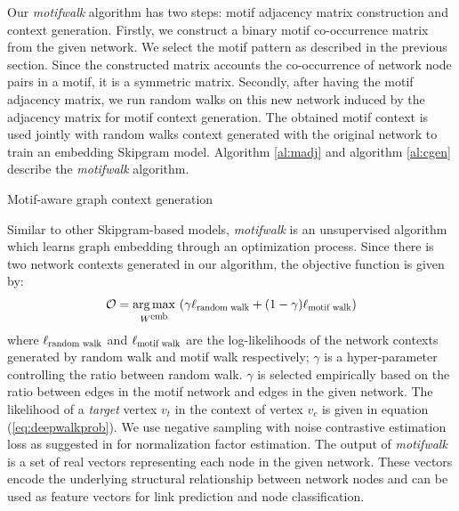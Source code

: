 \documentclass{article}
\DeclareMathOperator*{\argmax}{arg\,max}
\theoremstyle{definition}
\begin{document}
Our \emph{motifwalk} algorithm has two steps: motif adjacency matrix
construction and context generation. Firstly, we construct a binary
motif co-occurrence matrix from the given network. We select the motif
pattern as described in the previous section. Since the constructed matrix 
accounts the co-occurrence of network node pairs in a motif, it is a 
symmetric matrix. Secondly, after having the motif adjacency matrix, 
we run random walks on this new network induced by the adjacency matrix
for motif context generation. The obtained motif context is used jointly 
with random walks context generated with the original network to train an 
embedding Skipgram model. Algorithm \ref{al:madj} and algorithm 
\ref{al:cgen} describe the \emph{motifwalk} algorithm.
\begin{algorithm}[h] \label{al:cgen}
\caption{Motif-aware graph context generation}
\end{algorithm}

Similar to other Skipgram-based models, \emph{motifwalk} is an unsupervised
algorithm which learns graph embedding through an optimization process. 
Since there is two network contexts generated in our algorithm, the 
objective function is given by:
\begin{equation} 
\begin{aligned}
&\mathcal{O} = \argmax_{W^{\scalebox{0.75}{emb}}}\ (\gamma 
\ell_{\scalebox{0.75}{random walk}} + (1-\gamma) \ell_{\scalebox{0.75}
{motif walk}}) \\
\end{aligned}
\label{eq:mloss}
\end{equation}
where $\ell_{\scalebox{0.75}{random walk}}$ and $\ell_{\scalebox{0.75}
{motif walk}}$
are the log-likelihoods of the network contexts generated by
random walk and motif walk respectively; $\gamma$ is a hyper-parameter
controlling the ratio between random walk. $\gamma$ is selected 
empirically based on the ratio between edges in the motif network and edges
in the given network. The likelihood
of a \emph{target} vertex $v_t$ in the context of vertex $v_c$ is given
in equation (\ref{eq:deepwalkprob}). We use negative sampling with noise
contrastive estimation loss as suggested in \cite{skipgram} for normalization
factor estimation. The output of \emph{motifwalk} is a set of real 
vectors representing each node in the given network. These vectors encode 
the underlying structural relationship between network nodes and can be used as 
feature vectors for link prediction and node classification.
\end{document}
